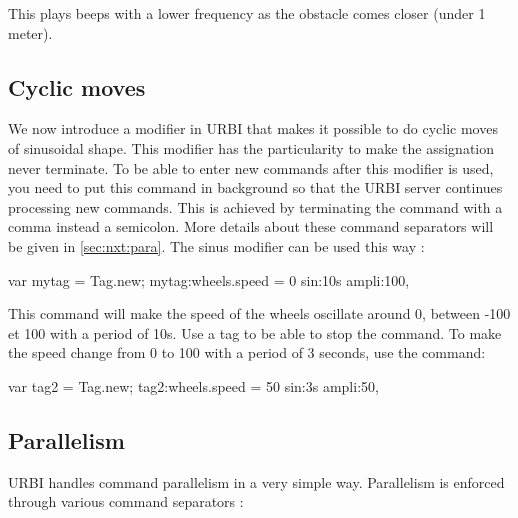 This plays beeps with a lower frequency as the obstacle comes closer (under 1
meter).

\subsection{Cyclic moves}
We now introduce a modifier in URBI that makes it possible to do cyclic moves
of sinusoidal shape. This modifier has the particularity to make the
assignation never terminate. To be able to enter new commands after this
modifier is used, you need to put this command in background so that the URBI
server continues processing new commands. This is achieved by terminating the
command with a comma instead a semicolon. More details about these command
separators will be given in \autoref{sec:nxt:para}.
The sinus modifier can be used this way :
\begin{urbiunchecked}
  var mytag = Tag.new; mytag:wheels.speed = 0 sin:10s ampli:100,
\end{urbiunchecked}

This command will make the speed of the wheels oscillate around 0, between -100
et 100 with a period of 10s. Use a tag to be able to stop the command. To make
the speed change from 0 to 100 with a period of 3 seconds, use the command:
\begin{urbiunchecked}
  var tag2 = Tag.new; tag2:wheels.speed = 50 sin:3s ampli:50,
\end{urbiunchecked}



\subsection{Parallelism}
\label{sec:nxt:para}
URBI handles command parallelism in a very simple way. Parallelism is enforced
through various command separators :

